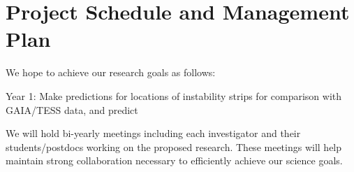 \section{Project Schedule and Management Plan}

We hope to achieve our research goals as follows:

Year 1: Make predictions for locations of instability strips for comparison with GAIA/TESS data, and predict  

We will  hold bi-yearly meetings including each investigator and their students/postdocs working on the proposed research. These meetings will help maintain strong collaboration necessary to efficiently achieve our science goals.
